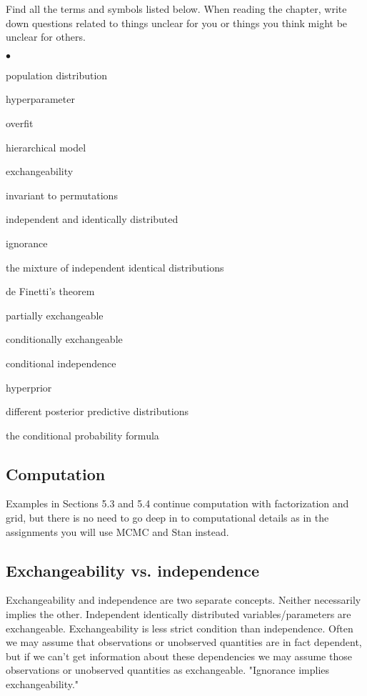 \documentclass[a4paper,11pt,english]{article}
\begin{document}
Find all the terms and symbols listed below. When reading the chapter,
write down questions related to things unclear for you or things you
think might be unclear for others. 
\begin{list}{$\bullet$}{\parsep=0pt\itemsep=2pt}
\item population distribution
\item hyperparameter
\item overfit
\item hierarchical model
\item exchangeability
\item invariant to permutations
\item independent and identically distributed
\item ignorance
\item the mixture of independent identical distributions
\item de Finetti's theorem
\item partially exchangeable
\item conditionally exchangeable
\item conditional independence
\item hyperprior
\item different posterior predictive distributions
\item the conditional probability formula
\end{list}

\subsection*{Computation}

Examples in Sections 5.3 and 5.4 continue computation with
factorization and grid, but there is no need to go deep in to
computational details as in the assignments you will use MCMC and Stan
instead. 

\subsection*{Exchangeability vs. independence}

Exchangeability and independence are two separate concepts.
Neither necessarily implies the other. Independent identically
distributed variables/parameters are exchangeable. Exchangeability
is less strict condition than independence. Often we may assume
that observations or unobserved quantities are in fact dependent,
but if we can't get information about these dependencies we may
assume those observations or unobserved quantities as
exchangeable. "Ignorance implies exchangeability."
\end{document}
